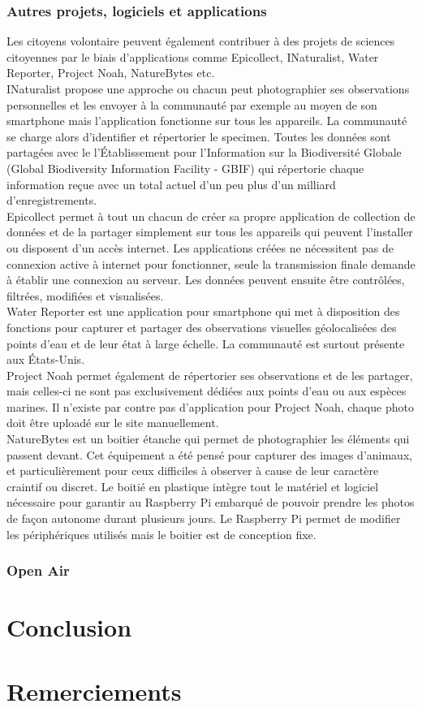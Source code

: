 \documentclass[10pt, article]{llncs}
\begin{document}
		\subsubsection{Autres projets, logiciels et applications}
			Les citoyens volontaire peuvent également contribuer à des projets de sciences citoyennes par le biais d'applications comme Epicollect, INaturalist, Water Reporter, Project Noah, NatureBytes etc.\\
			INaturalist propose une approche ou chacun peut photographier ses observations personnelles et les envoyer à la communauté par exemple au moyen de son smartphone mais l'application fonctionne sur tous les appareils. La communauté se charge alors d'identifier et répertorier le specimen. Toutes les données sont partagées avec le l'Établissement pour l'Information sur la Biodiversité Globale (Global Biodiversity Information Facility - GBIF) qui répertorie chaque information reçue avec un total actuel d'un peu plus d'un milliard d'enregistrements.\\
			Epicollect permet à tout un chacun de créer sa propre application de collection de données et de la partager simplement sur tous les appareils qui peuvent l'installer ou disposent d'un accès internet. Les applications créées ne nécessitent pas de connexion active à internet pour fonctionner, seule la transmission finale demande à établir une connexion au serveur. Les données peuvent ensuite être contrôlées, filtrées, modifiées et visualisées. \\
			Water Reporter est une application pour smartphone qui met à disposition des fonctions pour capturer et partager des observations visuelles géolocalisées des points d'eau et de leur état à large échelle. La communauté est surtout présente aux États-Unis.\\
			Project Noah permet également de répertorier ses observations et de les partager, mais celles-ci ne sont pas exclusivement dédiées aux points d'eau ou aux espèces marines. Il n'existe par contre pas d'application pour Project Noah, chaque photo doit être uploadé sur le site manuellement.\\
			NatureBytes est un boitier  étanche qui permet de photographier les éléments qui passent devant. Cet équipement a été pensé pour capturer des images d'animaux, et particulièrement pour ceux difficiles à observer à cause de leur caractère craintif ou discret. Le boitié en plastique intègre tout le matériel et logiciel nécessaire pour garantir au Raspberry Pi embarqué de pouvoir prendre les photos de façon autonome durant plusieurs jours. Le Raspberry Pi permet de modifier les périphériques utilisés mais le boitier est de conception fixe.
		
		\subsubsection{Open Air}

\section{Conclusion}\label{sec:conclusion}

\section*{Remerciements}





\end{document}
